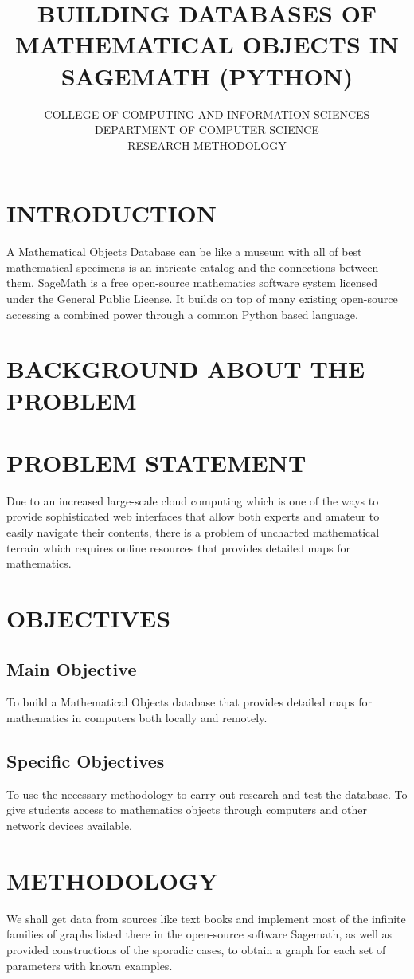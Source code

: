 \documentclass[11pt]{report}
\title{\textbf{BUILDING DATABASES OF MATHEMATICAL OBJECTS IN SAGEMATH (PYTHON)}}
\author{COLLEGE OF COMPUTING AND INFORMATION SCIENCES\\DEPARTMENT OF COMPUTER SCIENCE\\RESEARCH METHODOLOGY}
\begin{document}
\maketitle

\section{INTRODUCTION}
A Mathematical Objects Database can be like a museum with all of best mathematical specimens is an intricate catalog and the connections between them. SageMath is a free open-source mathematics software system licensed under the General Public License. It builds on top of many existing open-source accessing a combined power through a common Python based language.

\section{BACKGROUND ABOUT THE PROBLEM}

\section{PROBLEM STATEMENT}
Due to an increased large-scale cloud computing which is one of the ways to
provide sophisticated web interfaces that allow both experts and amateur to
easily navigate their contents, there is a problem of uncharted mathematical
terrain which requires online resources that provides detailed maps for
mathematics.
\section{OBJECTIVES}
\subsection{Main Objective}
To build a Mathematical Objects database that provides detailed maps for
mathematics in computers both locally and remotely.

\subsection{Specific Objectives}
To use the necessary methodology to carry out research and test the database.
To give students access to mathematics objects through computers and other
network devices available.

\section{METHODOLOGY}
We shall get data from sources like text books and implement most of the infinite families of graphs listed there in the open-source software Sagemath, as well as provided constructions of the sporadic cases, to obtain a graph for each set of parameters with known examples.
\end{document}
